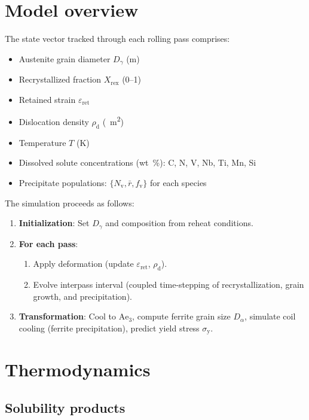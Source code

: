 \documentclass[11pt,a4paper]{article}
\newcommand{\DG}{\ensuremath{D_\gamma}}
\newcommand{\DA}{\ensuremath{D_\alpha}}
\newcommand{\Xrex}{\ensuremath{X_\mathrm{rex}}}
\newcommand{\epsr}{\ensuremath{\varepsilon_\mathrm{ret}}}
\newcommand{\rhod}{\ensuremath{\rho_\mathrm{d}}}
\newcommand{\sy}{\ensuremath{\sigma_\mathrm{y}}}
\newcommand{\fv}{\ensuremath{f_\mathrm{v}}}
\newcommand{\Nv}{\ensuremath{N_\mathrm{v}}}
\newcommand{\Ae}{\ensuremath{\mathrm{Ae}_3}}
\begin{document}
\section{Model overview}

The state vector tracked through each rolling pass comprises:
\begin{itemize}
  \item Austenite grain diameter \DG{} (\si{\metre})
  \item Recrystallized fraction \Xrex{} (0--1)
  \item Retained strain \epsr{}
  \item Dislocation density \rhod{} (\si{\per\metre\squared})
  \item Temperature $T$ (\si{\kelvin})
  \item Dissolved solute concentrations (\si{wt.\%}): C, N, V, Nb, Ti, Mn, Si
  \item Precipitate populations: $\{\Nv, \bar{r}, \fv\}$ for each species
\end{itemize}

The simulation proceeds as follows:
\begin{enumerate}
  \item \textbf{Initialization}: Set \DG{} and composition from reheat conditions.
  \item \textbf{For each pass}:
    \begin{enumerate}
      \item Apply deformation (update \epsr, \rhod).
      \item Evolve interpass interval (coupled time-stepping of recrystallization,
            grain growth, and precipitation).
    \end{enumerate}
  \item \textbf{Transformation}: Cool to \Ae, compute ferrite grain size \DA,
        simulate coil cooling (ferrite precipitation), predict yield stress \sy.
\end{enumerate}

\section{Thermodynamics}
\label{sec:thermo}

\subsection{Solubility products}
\end{document}
